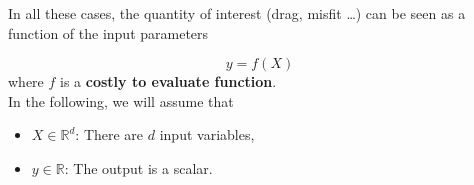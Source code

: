 


\begin{frame}{}
In all these cases, the quantity of interest (drag, misfit \dots) can be seen as a function of the input parameters

$$ y = f(X) $$
where $f$ is a \textbf{costly to evaluate function}. \\
\vspace{5mm}
In the following, we will assume that
\begin{itemize}
	\item $X \in \mathds{R}^d$: There are $d$ input variables,
	\item $y \in \mathds{R}$: The output is a scalar.
\end{itemize}
\end{frame}

